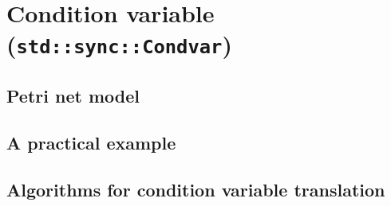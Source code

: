 \section{Condition variable (\texttt{std::sync::Condvar})}

\subsection{Petri net model}

\subsection{A practical example}

\subsection{Algorithms for condition variable translation}
\label{sec:condvar-algorithms}